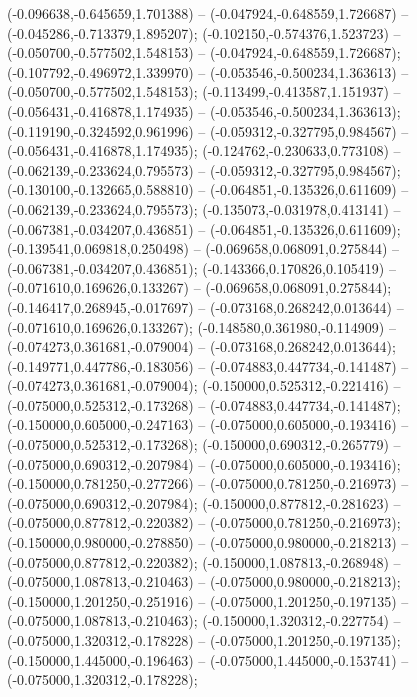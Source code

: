  (-0.096638,-0.645659,1.701388) -- (-0.047924,-0.648559,1.726687) -- (-0.045286,-0.713379,1.895207);
 (-0.102150,-0.574376,1.523723) -- (-0.050700,-0.577502,1.548153) -- (-0.047924,-0.648559,1.726687);
 (-0.107792,-0.496972,1.339970) -- (-0.053546,-0.500234,1.363613) -- (-0.050700,-0.577502,1.548153);
 (-0.113499,-0.413587,1.151937) -- (-0.056431,-0.416878,1.174935) -- (-0.053546,-0.500234,1.363613);
 (-0.119190,-0.324592,0.961996) -- (-0.059312,-0.327795,0.984567) -- (-0.056431,-0.416878,1.174935);
 (-0.124762,-0.230633,0.773108) -- (-0.062139,-0.233624,0.795573) -- (-0.059312,-0.327795,0.984567);
 (-0.130100,-0.132665,0.588810) -- (-0.064851,-0.135326,0.611609) -- (-0.062139,-0.233624,0.795573);
 (-0.135073,-0.031978,0.413141) -- (-0.067381,-0.034207,0.436851) -- (-0.064851,-0.135326,0.611609);
 (-0.139541,0.069818,0.250498) -- (-0.069658,0.068091,0.275844) -- (-0.067381,-0.034207,0.436851);
 (-0.143366,0.170826,0.105419) -- (-0.071610,0.169626,0.133267) -- (-0.069658,0.068091,0.275844);
 (-0.146417,0.268945,-0.017697) -- (-0.073168,0.268242,0.013644) -- (-0.071610,0.169626,0.133267);
 (-0.148580,0.361980,-0.114909) -- (-0.074273,0.361681,-0.079004) -- (-0.073168,0.268242,0.013644);
 (-0.149771,0.447786,-0.183056) -- (-0.074883,0.447734,-0.141487) -- (-0.074273,0.361681,-0.079004);
 (-0.150000,0.525312,-0.221416) -- (-0.075000,0.525312,-0.173268) -- (-0.074883,0.447734,-0.141487);
 (-0.150000,0.605000,-0.247163) -- (-0.075000,0.605000,-0.193416) -- (-0.075000,0.525312,-0.173268);
 (-0.150000,0.690312,-0.265779) -- (-0.075000,0.690312,-0.207984) -- (-0.075000,0.605000,-0.193416);
 (-0.150000,0.781250,-0.277266) -- (-0.075000,0.781250,-0.216973) -- (-0.075000,0.690312,-0.207984);
 (-0.150000,0.877812,-0.281623) -- (-0.075000,0.877812,-0.220382) -- (-0.075000,0.781250,-0.216973);
 (-0.150000,0.980000,-0.278850) -- (-0.075000,0.980000,-0.218213) -- (-0.075000,0.877812,-0.220382);
 (-0.150000,1.087813,-0.268948) -- (-0.075000,1.087813,-0.210463) -- (-0.075000,0.980000,-0.218213);
 (-0.150000,1.201250,-0.251916) -- (-0.075000,1.201250,-0.197135) -- (-0.075000,1.087813,-0.210463);
 (-0.150000,1.320312,-0.227754) -- (-0.075000,1.320312,-0.178228) -- (-0.075000,1.201250,-0.197135);
 (-0.150000,1.445000,-0.196463) -- (-0.075000,1.445000,-0.153741) -- (-0.075000,1.320312,-0.178228);
